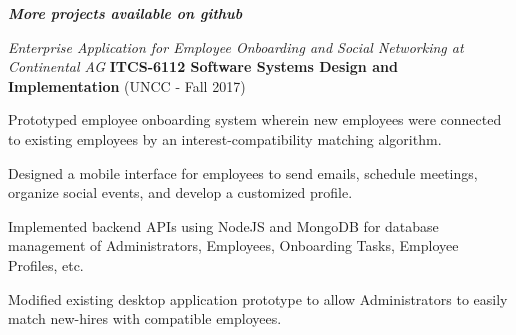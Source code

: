 \documentclass[12p4, letterpaper]{article}
\newenvironment{itemize*}
{\begin{itemize}\setlength{\itemsep}{0pt}}{\end{itemize}}
\newcommand{\mhead}[1]{\leavevmode\marginpar{\sffamily\footnotesize #1}}
\begin{document}
\bigskip
\mhead{Projects}%
\textbf{\emph{More projects available on github}}\smallskip

\emph{Enterprise Application for Employee Onboarding and Social Networking at Continental AG}\newline
\textbf{ITCS-6112 Software Systems Design and Implementation} (UNCC - Fall 2017)
\begin{itemize*}
	\item{Prototyped employee onboarding system wherein new employees were connected to existing employees by an interest-compatibility matching algorithm.}
	\item{Designed a mobile interface for employees to send emails, schedule meetings, organize social events, and develop a customized profile.}
	\item{Implemented backend APIs using NodeJS and MongoDB for database management of Administrators, Employees, Onboarding Tasks, Employee Profiles, etc.}
	\item{Modified existing desktop application prototype to allow Administrators to easily match new-hires with compatible employees.}
\end{itemize*}
\end{document}
